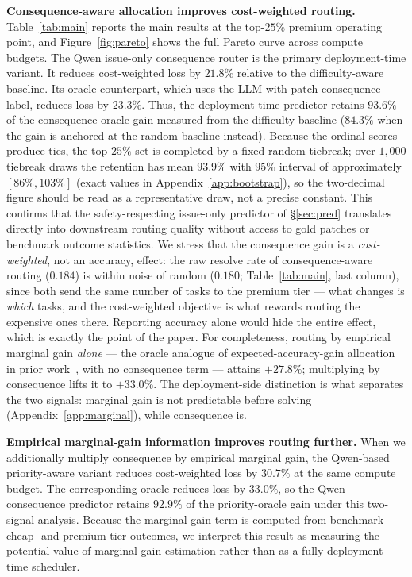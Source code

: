\documentclass{article}
\begin{document}
\textbf{Consequence-aware allocation improves cost-weighted routing.}
Table~\ref{tab:main} reports the main results at the top-$25\%$
premium operating point, and Figure~\ref{fig:pareto} shows the full
Pareto curve across compute budgets. The Qwen issue-only consequence router is the primary deployment-time
variant. It reduces cost-weighted loss by $21.8\%$ relative to the
difficulty-aware baseline. Its oracle counterpart, which uses the
LLM-with-patch consequence label, reduces loss by $23.3\%$. Thus, the
deployment-time predictor retains $93.6\%$ of the consequence-oracle
gain measured from the difficulty baseline ($84.3\%$ when the gain is
anchored at the random baseline instead). Because the ordinal scores
produce ties, the top-$25\%$ set is completed by a fixed random
tiebreak; over $1{,}000$ tiebreak draws the retention has mean
$93.9\%$ with $95\%$ interval of approximately $[86\%, 103\%]$
(exact values in Appendix~\ref{app:bootstrap}), so the two-decimal figure should be
read as a representative draw, not a precise constant. This confirms
that the safety-respecting issue-only predictor of
\S\ref{sec:pred} translates directly into downstream routing quality
without access to gold patches or benchmark outcome statistics. We
stress that the consequence gain is a \emph{cost-weighted}, not an
accuracy, effect: the raw resolve rate of consequence-aware routing
($0.184$) is within noise of random ($0.180$; Table~\ref{tab:main},
last column), since both send the same number of tasks to the premium
tier --- what changes is \emph{which} tasks, and the cost-weighted
objective is what rewards routing the expensive ones there. Reporting
accuracy alone would hide the entire effect, which is exactly the
point of the paper. For
completeness, routing by empirical marginal gain \emph{alone} --- the
oracle analogue of expected-accuracy-gain allocation in prior
work~\citep{damani2024learning}, with no consequence term --- attains
$+27.8\%$; multiplying by consequence lifts it to $+33.0\%$. The
deployment-side distinction is what separates the two signals:
marginal gain is not predictable before solving
(Appendix~\ref{app:marginal}), while consequence is.

\textbf{Empirical marginal-gain information improves routing further.}
When we additionally multiply consequence by empirical marginal gain,
the Qwen-based priority-aware variant reduces cost-weighted loss by
$30.7\%$ at the same compute budget. The corresponding oracle reduces
loss by $33.0\%$, so the Qwen consequence predictor retains $92.9\%$
of the priority-oracle gain under this two-signal analysis. Because
the marginal-gain term is computed from benchmark cheap- and
premium-tier outcomes, we interpret this result as measuring the
potential value of marginal-gain estimation rather than as a fully
deployment-time scheduler.
\end{document}
